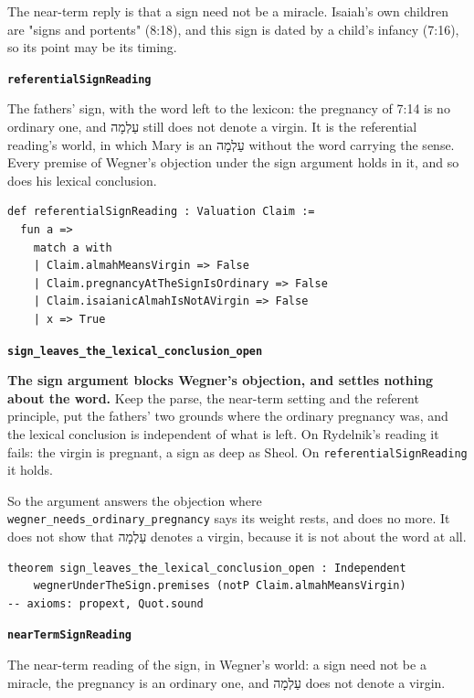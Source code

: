 \documentclass[11pt]{article}
\begin{document}
The near-term reply is that a sign need not be a miracle. Isaiah's own children are "signs and portents" (8:18), and this sign is dated by a child's infancy (7:16), so its point may be its timing.

\par\medskip\noindent\textbf{\texttt{referential\allowbreak{}Sign\allowbreak{}Reading}}\par\nobreak\noindent
The fathers' sign, with the word left to the lexicon: the pregnancy of 7:14 is no ordinary one, and עַלְמָה still does not denote a virgin. It is the referential reading's world, in which Mary is an עַלְמָה without the word carrying the sense. Every premise of Wegner's objection under the sign argument holds in it, and so does his lexical conclusion.

{\small\begin{verbatim}
def referentialSignReading : Valuation Claim :=
  fun a =>
    match a with
    | Claim.almahMeansVirgin => False
    | Claim.pregnancyAtTheSignIsOrdinary => False
    | Claim.isaianicAlmahIsNotAVirgin => False
    | x => True
\end{verbatim}}
\par\medskip\noindent\textbf{\texttt{sign\_\allowbreak{}leaves\_\allowbreak{}the\_\allowbreak{}lexical\_\allowbreak{}conclusion\_\allowbreak{}open}}\par\nobreak\noindent
\textbf{The sign argument blocks Wegner's objection, and settles nothing about the word.} Keep the parse, the near-term setting and the referent principle, put the fathers' two grounds where the ordinary pregnancy was, and the lexical conclusion is independent of what is left. On Rydelnik's reading it fails: the virgin is pregnant, a sign as deep as Sheol. On \texttt{referential\allowbreak{}Sign\allowbreak{}Reading} it holds.

So the argument answers the objection where \texttt{wegner\_\allowbreak{}needs\_\allowbreak{}ordinary\_\allowbreak{}pregnancy} says its weight rests, and does no more. It does not show that עַלְמָה denotes a virgin, because it is not about the word at all.

{\small\begin{verbatim}
theorem sign_leaves_the_lexical_conclusion_open : Independent
    wegnerUnderTheSign.premises (notP Claim.almahMeansVirgin)
-- axioms: propext, Quot.sound
\end{verbatim}}
\par\medskip\noindent\textbf{\texttt{near\allowbreak{}Term\allowbreak{}Sign\allowbreak{}Reading}}\par\nobreak\noindent
The near-term reading of the sign, in Wegner's world: a sign need not be a miracle, the pregnancy is an ordinary one, and עַלְמָה does not denote a virgin.
\end{document}
